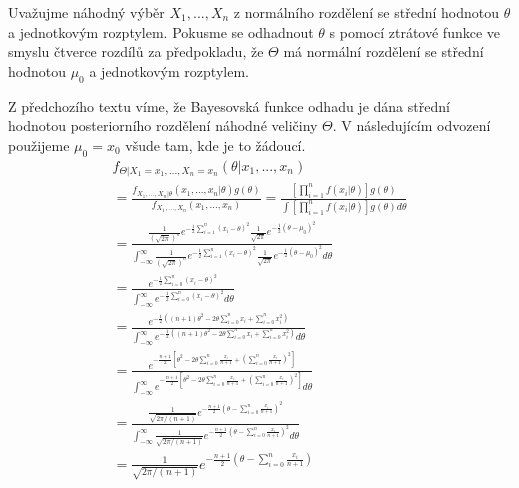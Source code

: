 \begin{example}
Uvažujme náhodný výběr $X_1, ..., X_n$ z normálního rozdělení se střední hodnotou $\theta$ a jednotkovým rozptylem. Pokusme se odhadnout $\theta$ s pomocí ztrátové funkce ve smyslu čtverce rozdílů za předpokladu, že $\Theta$ má normální rozdělení se střední hodnotou $\mu_0$ a jednotkovým rozptylem.

Z předchozího textu víme, že Bayesovská funkce odhadu je dána střední hodnotou posteriorního rozdělení náhodné veličiny $\Theta$. V následujícím odvození použijeme $\mu_0 = x_0$ všude tam, kde je to žádoucí.
\begin{gather*}
f_{\Theta|X_1 = x_1, ..., X_n = x_n}(\theta|x_1, ..., x_n)\\
= \frac{f_{X_1, ..., X_n|\theta}(x_1, ..., x_n|\theta)g(\theta)}{f_{X_1, ..., X_n}(x_1, ..., x_n)} = \frac{\left[\prod_{i = 1}^n f(x_i|\theta)\right]g(\theta)}{\int \left[\prod_{i = 1}^n f(x_i|\theta)\right]g(\theta)d \theta}\\
= \frac{\frac{1}{\left(\sqrt{2 \pi}\right)^n}e^{-\frac{1}{2}\sum_{i = 1}^n (x_i - \theta)^2}\frac{1}{\sqrt{2\pi}}e^{-\frac{1}{2}(\theta - \mu_0)^2}}{\int_{-\infty}^{\infty}\frac{1}{\left(\sqrt{2 \pi}\right)^n}e^{-\frac{1}{2}\sum_{i = 1}^n (x_i - \theta)^2}\frac{1}{\sqrt{2\pi}}e^{-\frac{1}{2}(\theta - \mu_0)^2}d \theta}\\
= \frac{e^{-\frac{1}{2}\sum_{i = 0}^n (x_i - \theta)^2}}{\int_{-\infty}^{\infty}e^{-\frac{1}{2}\sum_{i = 0}^n (x_i - \theta)^2} d \theta}\\
= \frac{e^{-\frac{1}{2}\left((n + 1)\theta^2 - 2 \theta \sum_{i = 0}^n x_i + \sum_{i = 0}^n x_i^2 \right)}}{\int_{-\infty}^{\infty}e^{-\frac{1}{2}\left((n + 1)\theta^2 - 2 \theta \sum_{i = 0}^n x_i + \sum_{i = 0}^n x_i^2 \right)}d \theta}\\
= \frac{e^{-\frac{n + 1}{2}\left[\theta^2 - 2\theta \sum_{i = 0}^n \frac{x_i}{n + 1} + \left(\sum_{i = 0}^n \frac{x_i}{n + 1}\right)^2\right]}}{\int_{-\infty}^{\infty}e^{-\frac{n + 1}{2}\left[\theta^2 - 2\theta \sum_{i = 0}^n \frac{x_i}{n + 1} + \left(\sum_{i = 0}^n \frac{x_i}{n + 1}\right)^2\right]}d \theta}\\
= \frac{\frac{1}{\sqrt{2 \pi / (n + 1)}}e^{-\frac{n + 1}{2}\left(\theta - \sum_{i = 0}^n \frac{x_i}{n + 1}\right)^2}}{\int_{-\infty}^{\infty}\frac{1}{\sqrt{2 \pi / (n + 1)}}e^{-\frac{n + 1}{2}\left(\theta - \sum_{i = 0}^n \frac{x_i}{n + 1}\right)^2} d \theta}\\
= \frac{1}{\sqrt{2 \pi / (n + 1)}}e^{-\frac{n + 1}{2}\left(\theta - \sum_{i = 0}^n \frac{x_i}{n + 1}\right)}

\end{gather*}
\end{example}
